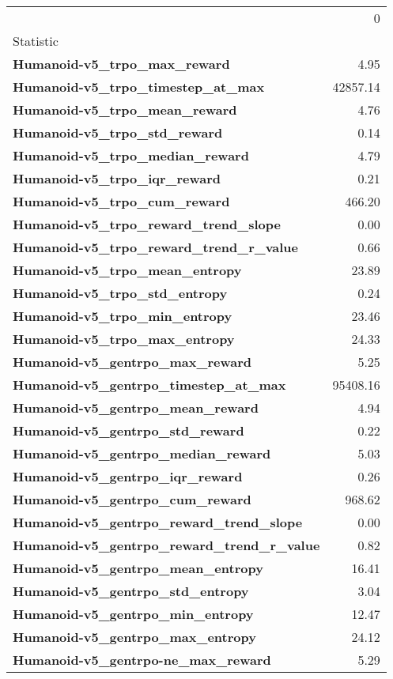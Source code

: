 \begin{tabular}{lr}
\toprule
 & 0 \\
Statistic &  \\
\midrule
\textbf{Humanoid-v5_trpo_max_reward} & 4.95 \\
\textbf{Humanoid-v5_trpo_timestep_at_max} & 42857.14 \\
\textbf{Humanoid-v5_trpo_mean_reward} & 4.76 \\
\textbf{Humanoid-v5_trpo_std_reward} & 0.14 \\
\textbf{Humanoid-v5_trpo_median_reward} & 4.79 \\
\textbf{Humanoid-v5_trpo_iqr_reward} & 0.21 \\
\textbf{Humanoid-v5_trpo_cum_reward} & 466.20 \\
\textbf{Humanoid-v5_trpo_reward_trend_slope} & 0.00 \\
\textbf{Humanoid-v5_trpo_reward_trend_r_value} & 0.66 \\
\textbf{Humanoid-v5_trpo_mean_entropy} & 23.89 \\
\textbf{Humanoid-v5_trpo_std_entropy} & 0.24 \\
\textbf{Humanoid-v5_trpo_min_entropy} & 23.46 \\
\textbf{Humanoid-v5_trpo_max_entropy} & 24.33 \\
\textbf{Humanoid-v5_gentrpo_max_reward} & 5.25 \\
\textbf{Humanoid-v5_gentrpo_timestep_at_max} & 95408.16 \\
\textbf{Humanoid-v5_gentrpo_mean_reward} & 4.94 \\
\textbf{Humanoid-v5_gentrpo_std_reward} & 0.22 \\
\textbf{Humanoid-v5_gentrpo_median_reward} & 5.03 \\
\textbf{Humanoid-v5_gentrpo_iqr_reward} & 0.26 \\
\textbf{Humanoid-v5_gentrpo_cum_reward} & 968.62 \\
\textbf{Humanoid-v5_gentrpo_reward_trend_slope} & 0.00 \\
\textbf{Humanoid-v5_gentrpo_reward_trend_r_value} & 0.82 \\
\textbf{Humanoid-v5_gentrpo_mean_entropy} & 16.41 \\
\textbf{Humanoid-v5_gentrpo_std_entropy} & 3.04 \\
\textbf{Humanoid-v5_gentrpo_min_entropy} & 12.47 \\
\textbf{Humanoid-v5_gentrpo_max_entropy} & 24.12 \\
\textbf{Humanoid-v5_gentrpo-ne_max_reward} & 5.29 \\

\end{tabular}
